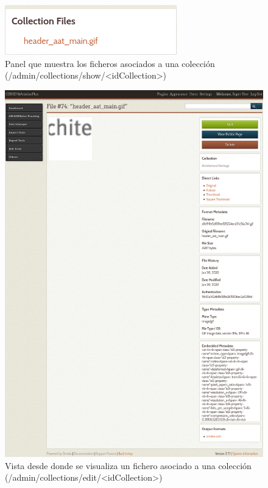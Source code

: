 \documentclass[
]{article}
\begin{document}
\begin{figure}
\hypertarget{collection-files-2}{%
\centering
\includegraphics{../_static/images/collection-files-2.png}
\caption{Panel que muestra los ficheros asociados a una colección
(/admin/collections/show/\textless idCollection\textgreater)}\label{collection-files-2}
}
\end{figure}

\begin{figure}
\hypertarget{cenieh-export-3}{%
\centering
\includegraphics{../_static/images/collection-files-3.png}
\caption{Vista desde donde se visualiza un fichero asociado a una
colección
(/admin/collections/edit/\textless idCollection\textgreater)}\label{cenieh-export-3}
}
\end{figure}
\end{document}
